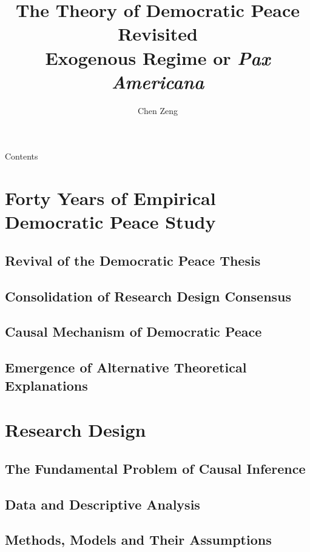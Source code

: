 \documentclass{beamer}
\title[The Theory of Democratic Peace Revisited]{The Theory of Democratic Peace Revisited \\ \large{Exogenous Regime or \textit{Pax Americana}}}
\author{Chen Zeng}
\institute[]{Department of Political Science \\ Renmin University of China}
\begin{document}
	\maketitle
	
	\begin{frame}{Contents}
		\tableofcontents
	\end{frame}

	\section{Forty Years of Empirical Democratic Peace Study}
	
	\subsection{Revival of the Democratic Peace Thesis}
	
	\subsection{Consolidation of Research Design Consensus}
	
	\subsection{Causal Mechanism of Democratic Peace}
	
	\subsection{Emergence of Alternative Theoretical Explanations}

	
	\section{Research Design}
	
	\subsection{The Fundamental Problem of Causal Inference}
	
	\subsection{Data and Descriptive Analysis}
	
	\subsection{Methods, Models and Their Assumptions}
	
\end{document}
